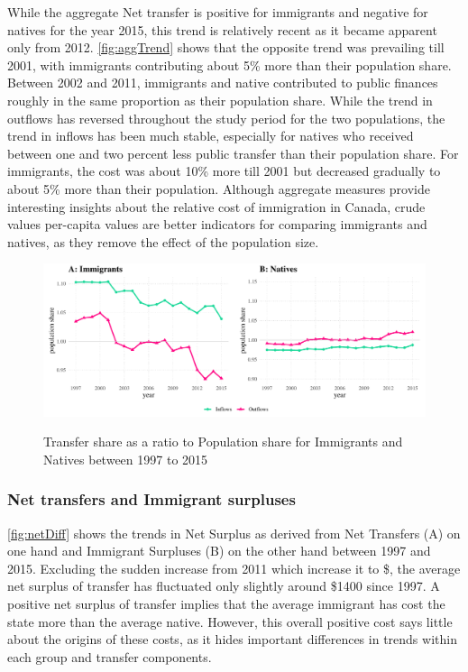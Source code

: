   While the aggregate Net transfer is positive for immigrants and negative for natives for the year 2015, this trend is relatively recent as it became apparent only from 2012.
\autoref{fig:aggTrend} shows that the opposite trend was prevailing till 2001, with immigrants contributing about 5\% more than their population share.
Between 2002 and 2011, immigrants and native contributed to public finances roughly in the same proportion as their population share.
While the trend in outflows has reversed throughout the study period for the two populations, the trend in inflows has been much stable, especially for natives who received between one and two percent less public transfer than their population share.
For immigrants, the cost was about 10\% more till 2001 but decreased gradually to about 5\% more than their population.
Although aggregate measures provide interesting insights about the relative cost of immigration in Canada, crude values per-capita values are better indicators for comparing immigrants and natives, as they remove the effect of the population size.

  \begin{figure}[H]%
    \caption{Transfer share as a ratio to Population share for Immigrants and Natives between 1997 to 2015}
    \includegraphics[width=1\textwidth]{res/aggTrend.pdf}%
    \label{fig:aggTrend}%
  \end{figure}%

  \subsubsection*{Net transfers and Immigrant surpluses}

  \autoref{fig:netDiff} shows the trends in Net Surplus as derived from Net Transfers (A) on one hand and Immigrant Surpluses (B) on the other hand between 1997 and 2015.
Excluding the sudden increase from 2011 which increase it to \$, the average net surplus of transfer has fluctuated only slightly around \$1400 since 1997.
A positive net surplus of transfer implies that the average immigrant has cost the state more than the average native.
However, this overall positive cost says little about the origins of these costs, as it hides important differences in trends within each group and transfer components.


